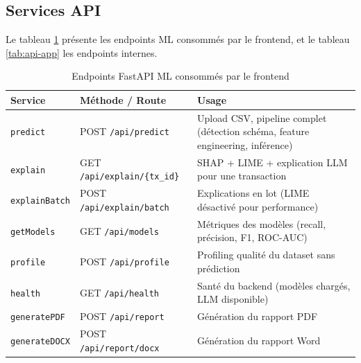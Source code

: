 \subsection{Services API}

Le tableau \ref{tab:api-ml} présente les endpoints ML consommés par le frontend, et le tableau \ref{tab:api-app} les endpoints internes.

\begin{table}[H]
\centering
\caption{Endpoints FastAPI ML consommés par le frontend}
\label{tab:api-ml}
\begin{tabular}{p{3.5cm} p{3cm} p{7cm}}
\toprule
\textbf{Service} & \textbf{Méthode / Route} & \textbf{Usage} \\
\midrule
\texttt{predict} & POST \texttt{/api/predict} & Upload CSV, pipeline complet (détection schéma, feature engineering, inférence) \\
\texttt{explain} & GET \texttt{/api/explain/\{tx\_id\}} & SHAP + LIME + explication LLM pour une transaction \\
\texttt{explainBatch} & POST \texttt{/api/explain/batch} & Explications en lot (LIME désactivé pour performance) \\
\texttt{getModels} & GET \texttt{/api/models} & Métriques des modèles (recall, précision, F1, ROC-AUC) \\
\texttt{profile} & POST \texttt{/api/profile} & Profiling qualité du dataset sans prédiction \\
\texttt{health} & GET \texttt{/api/health} & Santé du backend (modèles chargés, LLM disponible) \\
\texttt{generatePDF} & POST \texttt{/api/report} & Génération du rapport PDF \\
\texttt{generateDOCX} & POST \texttt{/api/report/docx} & Génération du rapport Word \\
\bottomrule
\end{tabular}
\end{table}

